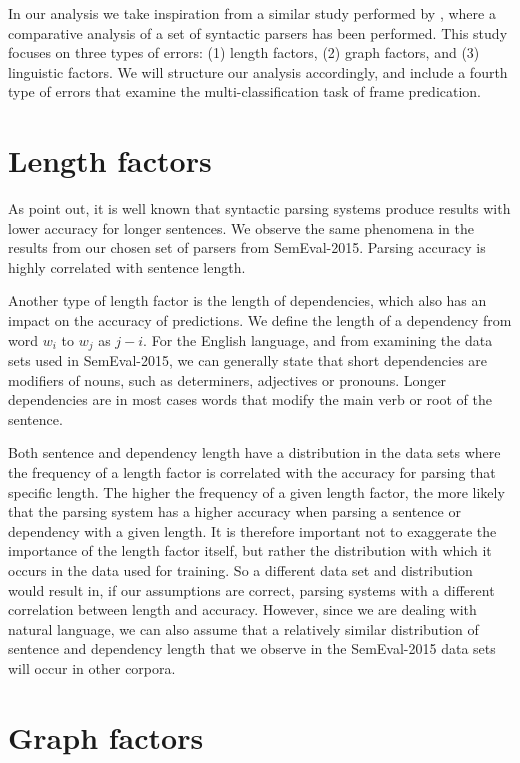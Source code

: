 In our analysis we take inspiration from a similar study performed by , where a comparative analysis of a set of syntactic parsers has been performed. This study focuses on three types of errors: (1) length factors, (2) graph factors, and (3) linguistic factors. We will structure our analysis accordingly, and include a fourth type of errors that examine the multi-classification task of frame predication.

\section{Length factors}

As  point out, it is well known that syntactic parsing systems produce results with lower accuracy for longer sentences. We observe the same phenomena in the results from our chosen set of parsers from SemEval-2015. Parsing accuracy is highly correlated with sentence length.

Another type of length factor is the length of dependencies, which also has an impact on the accuracy of predictions. We define the length of a dependency from word $w_i$ to $w_j$ as $j - i$. For the English language, and from examining the data sets used in SemEval-2015, we can generally state that short dependencies are modifiers of nouns, such as determiners, adjectives or pronouns. Longer dependencies are in most cases words that modify the main verb or root of the sentence. 

Both sentence and dependency length have a distribution in the data sets where the frequency of a length factor is correlated with the accuracy for parsing that specific length. The higher the frequency of a given length factor, the more likely that the parsing system has a higher accuracy when parsing a sentence or dependency with a given length. It is therefore important not to exaggerate the importance of the length factor itself, but rather the distribution with which it occurs in the data used for training. So a different data set and distribution would result in, if our assumptions are correct, parsing systems with a different correlation between length and accuracy. However, since we are dealing with natural language, we can also assume that a relatively similar distribution of sentence and dependency length that we observe in the SemEval-2015 data sets will occur in other corpora.

\section{Graph factors}

